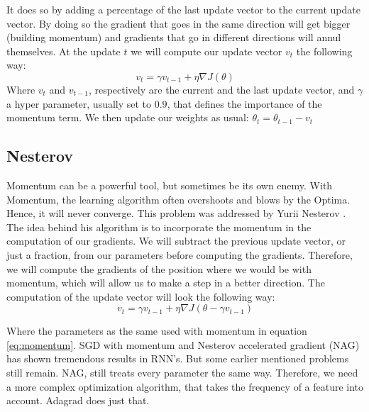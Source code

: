 It does so by adding a percentage of the last update vector to the current update vector. By doing so the gradient that goes in the same direction will get bigger (building momentum) and gradients that go in different directions will annul themselves.
At the update $t$ we will compute our update vector $v_t$ the following way:
\begin{equation}
v_t = \gamma v_{t-1} + \eta \nabla J (\theta)
\end{equation}\label{eq:momentum}
Where $v_t$ and $v_{t-1}$, respectively are the current and the last update vector, and $\gamma$ a hyper parameter, usually set to $0.9$, that defines the importance of the momentum term. We then update our weights as usual: $\theta_t = \theta_{t-1} - v_t$
\subsection{Nesterov}
Momentum can be a powerful tool, but sometimes be its own enemy. With Momentum, the learning algorithm often overshoots and blows by the Optima. Hence, it will never converge. This problem was addressed by Yurii Nesterov \cite{nesterov}. The idea behind his algorithm is to incorporate the momentum in the computation of our gradients. We will subtract the previous update vector, or just a fraction, from our parameters before computing the gradients. Therefore, we will compute the gradients of the position where we would be with momentum, which will allow us to make a step in a better direction. The computation of the update vector will look the following way:
\begin{equation}
v_t = \gamma v_{t-1} + \eta \nabla J (\theta - \gamma v_{t-1})
\end{equation}

Where the parameters as the same used with momentum in equation \ref{eq:momentum}. SGD with momentum and Nesterov accelerated gradient (NAG) has shown tremendous results in RNN's. But some earlier mentioned problems still remain. NAG, still treats every parameter the same way. Therefore, we need a more complex optimization algorithm, that takes the frequency of a feature into account. Adagrad does just that.

